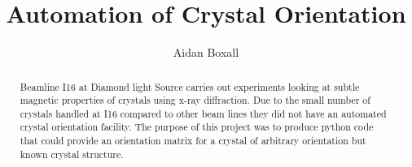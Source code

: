 \documentclass[10pt,a4paper]{article}
\begin{document}
\title{Automation of Crystal Orientation}
\author{Aidan  Boxall}
\maketitle

\begin{abstract}
Beamline I16 at Diamond light Source carries out experiments looking at subtle magnetic properties of crystals using x-ray diffraction. Due to the small
number of crystals handled at I16 compared to other beam lines they did not have an automated crystal orientation facility. The purpose of this project was
to produce python code that could provide an orientation matrix for a crystal of arbitrary orientation but known crystal structure.
\end{abstract}
\end{document}
